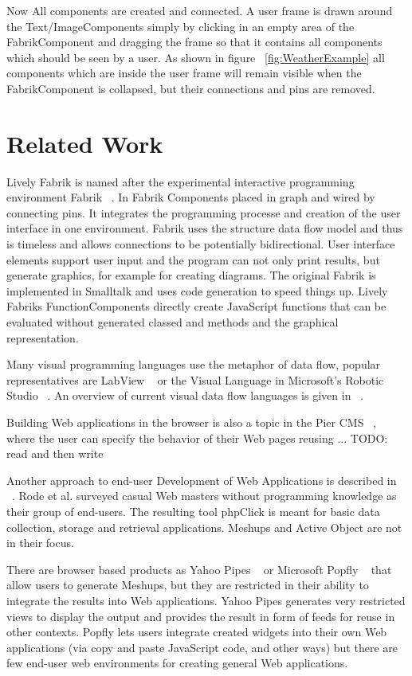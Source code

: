 \documentclass[pdftex, times, 10pt, twocolumn]{article}
\begin{document}
Now All components are created and connected. A user frame is drawn around the Text/ImageComponents simply by clicking in an empty area of the FabrikComponent and dragging the frame so that it contains all components which should be seen by a user. As shown in figure ~\ref{fig:WeatherExample} all components which are inside the user frame will remain visible when the FabrikComponent is collapsed, but their connections and pins are removed. 



\section{Related Work}
Lively Fabrik is named after the experimental interactive programming environment Fabrik ~\cite{Ingalls1988FVP,Ludolph1988FPE}. In Fabrik Components placed in graph and wired  by connecting pins. It integrates the programming processe and creation of the user interface in one environment. Fabrik uses the structure data flow model and thus is timeless and allows connections to be potentially bidirectional. User interface elements support user input and the program can not only print results, but generate graphics, for example for creating diagrams. The original Fabrik is implemented in Smalltalk and uses code generation to speed things up. Lively Fabriks FunctionComponents directly create JavaScript functions that can be evaluated without generated classed and methods and the graphical representation.  

Many visual programming languages use the metaphor of data flow, popular representatives are LabView ~\cite{Bitter2006LAP} or the Visual Language in Microsoft's Robotic Studio ~\cite{Morgan2008PMR}. An overview of current visual data flow languages is given in ~\cite{Johnston2004ADP}. 

Building Web applications in the browser is also a topic in the Pier CMS ~\cite{Renggli2008PMD}, where the user can specify the behavior of their Web pages reusing  ... TODO: read and then write 

Another approach to end-user Development of Web Applications is described in ~\cite{Rode2006EUD}. Rode et al. surveyed casual Web masters without programming knowledge as their group of end-users. The resulting tool phpClick is meant for basic data collection, storage and retrieval applications. Meshups and Active Object are not in their focus. 

There are browser based products as Yahoo Pipes ~\cite{YahooPipes} or Microsoft Popfly ~\cite{MicrosoftPopfly} that allow users to generate Meshups, but they are restricted in their ability to integrate the results into Web applications. Yahoo Pipes generates very restricted views to display the output and provides the result in form of feeds for reuse in other contexts. Popfly lets users integrate created widgets into their own Web applications (via copy and paste JavaScript code, and other ways) but there are few end-user web environments for creating general Web applications. 
\end{document}
